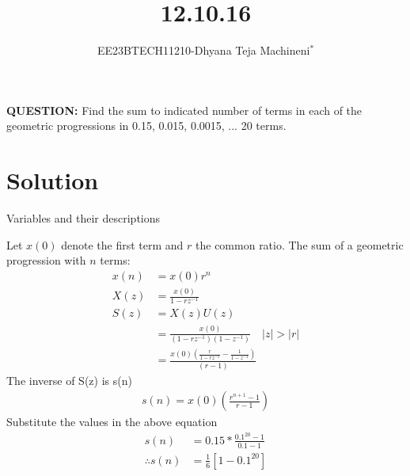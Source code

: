 \documentclass[journal,12pt,twocolumn]{IEEEtran}
\theoremstyle{remark}
\begin{document}

\vspace{3cm}
\title{\textbf{12.10.16}}
\author{EE23BTECH11210-Dhyana Teja Machineni$^{*}$%
}
\maketitle
\newpage
\bigskip

\textbf{QUESTION:}
Find the sum to indicated number of terms in each of the geometric progressions in
0.15, 0.015, 0.0015, ... 20 terms.
\section*{Solution}

 \renewcommand{\thefigure}{\theenumi}
 \renewcommand{\thetable}{\theenumi}

 \begin{flushleft}
     \begin{table}[h]
         \caption{Variables and their descriptions}
         \label{tab:table1}
         
     \end{table}
 \end{flushleft}
Let \( x(0) \) denote the first term and \( r \) the common ratio. The sum of a geometric progression with \( n \) terms:
\begin{align}
x(n) &= x(0)r^n \\
X(z) &= \frac{x(0)}{1-rz^{-1}} \\
S(z) &= X(z)U(z) \\
     &= \frac{x(0)}{(1-rz^{-1})(1-z^{-1})} \quad \lvert z \rvert > \lvert r \rvert \\
     &= \frac{x(0)(\frac{r}{1-rz^{-1}}-\frac{1}{1-z^{-1}})}{(r-1)}
\end{align}
The inverse of S(z) is s(n) 
\begin{align}
s(n)= x(0)(\frac{r^{n+1}-1}{r-1})
\end{align}
Substitute the values in the above equation
\begin{align}
s(n)&= 0.15*\frac{0.1^{20} -1}{0.1-1}\\
 \therefore s(n)&= \frac{1}{6}[1-0.1^{20}]
\end{align}
\end{document}
